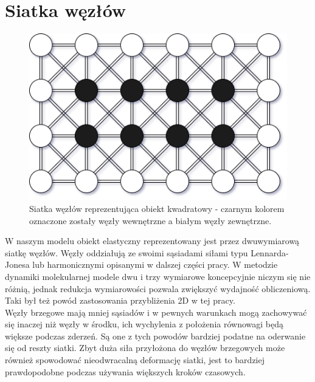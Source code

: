 \documentclass[12pt, letterpaper]{report}
\begin{document}
    \section{Siatka węzłów}

    \begin{figure}
        \includegraphics[width=0.95\linewidth]{object_shema.png}
        \caption{
            Siatka węzłów reprezentująca obiekt kwadratowy - 
            czarnym kolorem oznaczone zostały węzły wewnętrzne a białym węzły zewnętrzne.
        }
    \end{figure}

    
    W naszym modelu obiekt elastyczny reprezentowany jest przez dwuwymiarową 
    siatkę węzłów. Węzły oddziałują ze swoimi sąsiadami siłami typu 
    Lennarda-Jonesa lub harmonicznymi opisanymi w dalszej części pracy.
    W metodzie dynamiki molekularnej modele dwu i trzy wymiarowe koncepcyjnie niczym się nie różnią, 
    jednak redukcja wymiarowości pozwala zwiększyć wydajność obliczeniową. 
    Taki był też powód zastosowania przybliżenia 2D w tej pracy. \\

    Węzły brzegowe mają mniej sąsiadów i w pewnych warunkach mogą zachowywać się inaczej niż węzły w środku, 
    ich wychylenia z położenia równowagi będą większe podczas zderzeń. Są one z tych powodów 
    bardziej podatne na oderwanie się od reszty siatki. Zbyt duża siła przyłożona do węzłów brzegowych 
    może również spowodować nieodwracalną deformację siatki, jest to bardziej prawdopodobne podczas 
    używania większych kroków czasowych.
    
\end{document}
